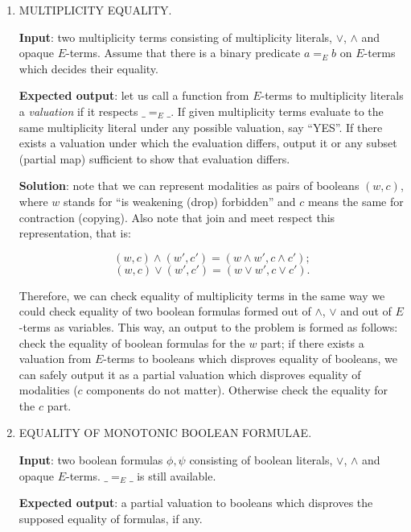\documentclass[a4paper,14pt]{extreport}
\begin{document}
\begin{enumerate}
    \item MULTIPLICITY EQUALITY.

        \textbf{Input}: two multiplicity terms consisting of multiplicity
        literals, $\lor$, $\land$ and opaque $E$-terms. Assume that there is a
        binary predicate $a =_E b$ on $E$-terms which decides their equality.

        \textbf{Expected output}: let us call a function from $E$-terms to
        multiplicity literals a \textit{valuation} if it respects $\_ =_E \_$.
        If given multiplicity terms evaluate to the same multiplicity literal
        under any possible valuation, say ``YES''. If there exists a valuation
        under which the evaluation differs, output it or any subset (partial
        map) sufficient to show that evaluation differs.

        \textbf{Solution}: note that we can represent modalities as pairs of
        booleans $(w, c)$, where $w$ stands for ``is weakening (drop)
        forbidden'' and $c$ means the same for contraction (copying). Also note
        that join and meet respect this representation, that is:

        \[ (w, c) \land (w', c') = (w \land w', c \land c'); \]
        \[ (w, c) \lor (w', c') = (w \lor w', c \lor c'). \]

        Therefore, we can check equality of multiplicity terms in the same way
        we could check equality of two boolean formulas formed out of $\land$,
        $\lor$ and out of $E$-terms as variables. This way, an output to the
        problem is formed as follows: check the equality of boolean formulas for
        the $w$ part; if there exists a valuation from $E$-terms to booleans
        which disproves equality of booleans, we can safely output it as a
        partial valuation which disproves equality of modalities ($c$ components
        do not matter). Otherwise check the equality for the $c$ part.

    \newpage
    \item EQUALITY OF MONOTONIC BOOLEAN FORMULAE.

        \textbf{Input}: two boolean formulas $\phi, \psi$ consisting of boolean
        literals, $\lor$, $\land$ and opaque $E$-terms. $\_ =_E \_$ is still
        available.

        \textbf{Expected output}: a partial valuation to booleans which
        disproves the supposed equality of formulas, if any.


\end{enumerate}
\end{document}
